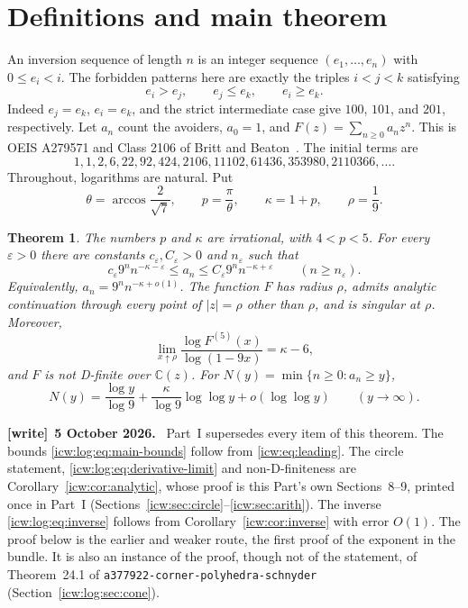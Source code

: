 \documentclass[11pt,letterpaper]{article}
\newtheorem{theorem}{Theorem}[section]
\theoremstyle{remark}\newtheorem{remark}[theorem]{Remark}
\newcommand{\CC}{\mathbb C}
\newcommand{\eps}{\varepsilon}
\newcommand{\1}{\mathbf1}
\newenvironment{writenote}[1][]{\par\smallskip\begingroup\small
 \noindent\textbf{[write]}\if\relax\detokenize{#1}\relax\else~\textbf{#1.}\fi\ }%
 {\par\endgroup\smallskip}
\newcommand{\file}[1]{\textup{\nolinkurl{#1}}}
\begin{document}
\section{Definitions and main theorem}\label{icw:log:sec:defs}
An inversion sequence of length $n$ is an integer sequence
$(e_1,\ldots,e_n)$ with $0\le e_i<i$. The forbidden patterns here are
exactly the triples $i<j<k$ satisfying
\begin{equation}\label{icw:log:eq:avoid}
 e_i>e_j,\qquad e_j\le e_k,\qquad e_i\ge e_k.
\end{equation}
Indeed $e_j=e_k$, $e_i=e_k$, and the strict intermediate case give
$100$, $101$, and $201$, respectively. Let $a_n$ count the avoiders,
$a_0=1$, and $F(z)=\sum_{n\ge0}a_nz^n$. This is OEIS A279571 and
Class 2106 of Britt and Beaton~\cite{oeis,bb}. The initial terms are
\[
 1,1,2,6,22,92,424,2106,11102,61436,353980,2110366,\ldots.
\]
Throughout, logarithms are natural. Put
\begin{equation}\label{icw:log:eq:constants}
 \theta=\arccos\frac2{\sqrt7},\qquad p=\frac\pi\theta,
 \qquad \kappa=1+p,\qquad \rho=\frac19.
\end{equation}
\begin{theorem}\label{icw:log:thm:main}
The numbers $p$ and $\kappa$ are irrational, with $4<p<5$. For every
$\eps>0$ there are constants $c_\eps,C_\eps>0$ and $n_\eps$ such that
\begin{equation}\label{icw:log:eq:main-bounds}
 c_\eps9^n n^{-\kappa-\eps}\le a_n
       \le C_\eps9^n n^{-\kappa+\eps}\qquad(n\ge n_\eps).
\end{equation}
Equivalently, $a_n=9^n n^{-\kappa+o(1)}$. The function $F$ has radius
$\rho$, admits analytic continuation through every point of
$|z|=\rho$ other than $\rho$, and is singular at $\rho$. Moreover,
\begin{equation}\label{icw:log:eq:derivative-limit}
 \lim_{x\uparrow\rho}\frac{\log F^{(5)}(x)}{\log(1-9x)}=\kappa-6,
\end{equation}
and $F$ is not D-finite over $\CC(z)$.
For $N(y)=\min\{n\ge0:a_n\ge y\}$,
\begin{equation}\label{icw:log:eq:inverse}
 N(y)=\frac{\log y}{\log9}
       +\frac{\kappa}{\log9}\log\log y+o(\log\log y)
       \qquad(y\to\infty).
\end{equation}
\end{theorem}
\begin{writenote}[5 October 2026]
Part~I supersedes every item of this theorem. The bounds \eqref{icw:log:eq:main-bounds} follow from \eqref{icw:eq:leading}. The circle statement, \eqref{icw:log:eq:derivative-limit} and non-D-finiteness are Corollary~\ref{icw:cor:analytic}, whose proof is this Part's own Sections~8--9, printed once in Part~I (Sections~\ref{icw:sec:circle}--\ref{icw:sec:arith}). The inverse \eqref{icw:log:eq:inverse} follows from Corollary~\ref{icw:cor:inverse} with error $O(1)$. The proof below is the earlier and weaker route, the first proof of the exponent in the bundle. It is also an instance of the proof, though not of the statement, of Theorem~24.1 of \file{a377922-corner-polyhedra-schnyder} (Section~\ref{icw:log:sec:cone}).
\end{writenote}
\end{document}
